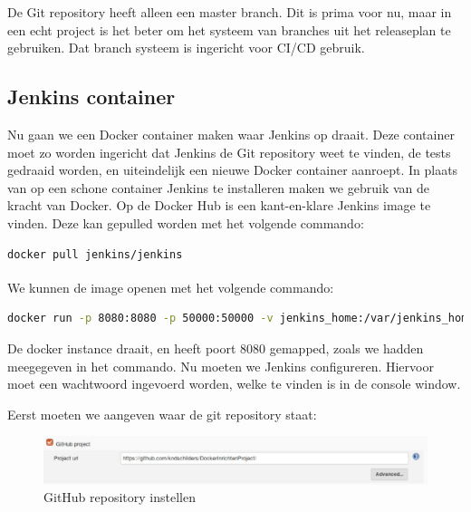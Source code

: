 \documentclass[12pt]{article}
\begin{document}
De Git repository heeft alleen een master branch. Dit is prima voor nu, maar in een echt project is het beter om het systeem van branches uit het releaseplan te gebruiken. Dat branch systeem is ingericht voor CI/CD gebruik.

\subsection{Jenkins container}
Nu gaan we een Docker container maken waar Jenkins op draait. Deze container moet zo worden ingericht dat Jenkins de Git repository weet te vinden, de tests gedraaid worden, en uiteindelijk een nieuwe Docker container aanroept.
\linebreak
In plaats van op een schone container Jenkins te installeren maken we gebruik van de kracht van Docker. Op de Docker Hub is een kant-en-klare Jenkins image te vinden. Deze kan gepulled worden met het volgende commando:

\begin{lstlisting}[language=Bash]
docker pull jenkins/jenkins
\end{lstlisting}

\noindent We kunnen de image openen met het volgende commando\textsuperscript{\cite{jenkins_documentation}}:

\begin{lstlisting}[language=Bash]
docker run -p 8080:8080 -p 50000:50000 -v jenkins_home:/var/jenkins_home jenkins/jenkins:latest
\end{lstlisting}

\noindent De docker instance draait, en heeft poort 8080 gemapped, zoals we hadden meegegeven in het commando. Nu moeten we Jenkins configureren. Hiervoor moet een wachtwoord ingevoerd worden, welke te vinden is in de console window.

Eerst moeten we aangeven waar de git repository staat:

\begin{figure}[H]
	\begin{center}
		\includegraphics[width=1.0\textwidth]{images/Jenkins-Github.PNG}
		\caption{GitHub repository instellen\label{fig:jenkins_config_repo}}
	\end{center}
\end{figure}
\end{document}
